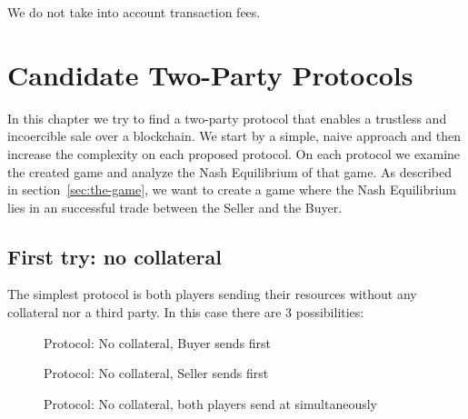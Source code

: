 \documentclass{cacthesis}
\begin{document}
We do not take into account transaction fees. 




\chapter{Candidate Two-Party Protocols}
\label{cha:candidates}
In this chapter we try to find a two-party protocol that enables a trustless and incoercible sale over a blockchain. We start by a simple, naive approach and then increase the complexity on each proposed protocol. On each protocol we examine the created game and analyze the Nash Equilibrium of that game. As described in section~\ref{sec:the-game}, we want to create a game where the Nash Equilibrium lies in an successful trade between the Seller and the Buyer.

\section{First try: no collateral}
\label{sec:first-try-nocol}
The simplest protocol is both players sending their resources without any collateral nor a third party. In this case there are 3 possibilities:
\begin{figure}[htb!]
    \centering
    \caption{Protocol: No collateral, Buyer sends first}
    \label{pro:naive-Buyer-first}
\end{figure}

\begin{figure}[htb!]
    \centering
    \caption{Protocol: No collateral, Seller sends first}
    \label{pro:naive-Seller-first}
\end{figure}

\begin{figure}[htb!]
    \centering
    \caption{Protocol: No collateral, both players send at simultaneously}
    \label{pro:naive-simultaneous}
\end{figure}
\end{document}
